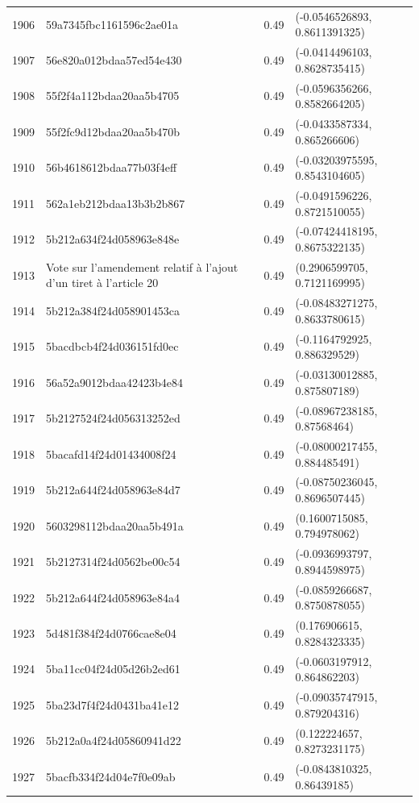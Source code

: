 \begin{table}[ht]
\begin{tabular}{rlrl}
  1906 & 59a7345fbc1161596c2ae01a & 0.49 & (-0.0546526893, 0.8611391325) \\ 
  1907 & 56e820a012bdaa57ed54e430 & 0.49 & (-0.0414496103, 0.8628735415) \\ 
  1908 & 55f2f4a112bdaa20aa5b4705 & 0.49 & (-0.0596356266, 0.8582664205) \\ 
  1909 & 55f2fc9d12bdaa20aa5b470b & 0.49 & (-0.0433587334, 0.865266606) \\ 
  1910 & 56b4618612bdaa77b03f4eff & 0.49 & (-0.03203975595, 0.8543104605) \\ 
  1911 & 562a1eb212bdaa13b3b2b867 & 0.49 & (-0.0491596226, 0.8721510055) \\ 
  1912 & 5b212a634f24d058963e848e & 0.49 & (-0.07424418195, 0.8675322135) \\ 
  1913 & Vote sur l'amendement relatif à l'ajout d'un tiret à l'article 20 & 0.49 & (0.2906599705, 0.7121169995) \\ 
  1914 & 5b212a384f24d058901453ca & 0.49 & (-0.08483271275, 0.8633780615) \\ 
  1915 & 5bacdbcb4f24d036151fd0ec & 0.49 & (-0.1164792925, 0.886329529) \\ 
  1916 & 56a52a9012bdaa42423b4e84 & 0.49 & (-0.03130012885, 0.875807189) \\ 
  1917 & 5b2127524f24d056313252ed & 0.49 & (-0.08967238185, 0.87568464) \\ 
  1918 & 5bacafd14f24d01434008f24 & 0.49 & (-0.08000217455, 0.884485491) \\ 
  1919 & 5b212a644f24d058963e84d7 & 0.49 & (-0.08750236045, 0.8696507445) \\ 
  1920 & 5603298112bdaa20aa5b491a & 0.49 & (0.1600715085, 0.794978062) \\ 
  1921 & 5b2127314f24d0562be00c54 & 0.49 & (-0.0936993797, 0.8944598975) \\ 
  1922 & 5b212a644f24d058963e84a4 & 0.49 & (-0.0859266687, 0.8750878055) \\ 
  1923 & 5d481f384f24d0766cae8e04 & 0.49 & (0.176906615, 0.8284323335) \\ 
  1924 & 5ba11cc04f24d05d26b2ed61 & 0.49 & (-0.0603197912, 0.864862203) \\ 
  1925 & 5ba23d7f4f24d0431ba41e12 & 0.49 & (-0.09035747915, 0.879204316) \\ 
  1926 & 5b212a0a4f24d05860941d22 & 0.49 & (0.122224657, 0.8273231175) \\ 
  1927 & 5bacfb334f24d04e7f0e09ab & 0.49 & (-0.0843810325, 0.86439185) \\ 

\end{tabular}
\end{table}
